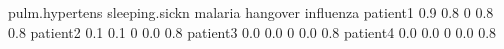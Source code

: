 \begin{Schunk}
% --begin: "comp.quant.atleast"
\begin{Soutput}
         pulm.hypertens sleeping.sickn malaria hangover influenza
patient1            0.9            0.8       0      0.8       0.8
patient2            0.1            0.1       0      0.0       0.8
patient3            0.0            0.0       0      0.0       0.8
patient4            0.0            0.0       0      0.0       0.8
\end{Soutput}
%
% --end: "comp.quant.atleast"
\end{Schunk}
